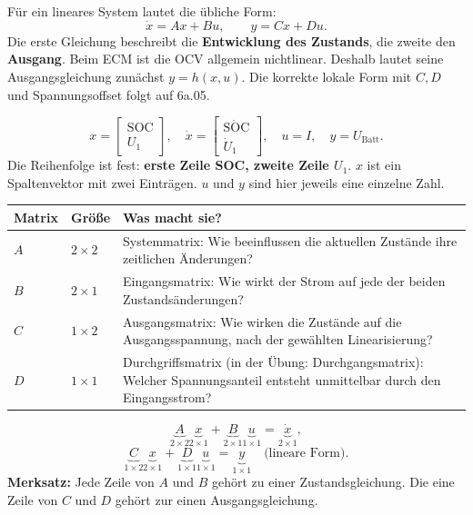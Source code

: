 Für ein lineares System lautet die übliche Form:
\[
\boxed{\dot x=Ax+Bu},\qquad \boxed{y=Cx+Du}.
\]
Die erste Gleichung beschreibt die \textbf{Entwicklung des Zustands}, die zweite den \textbf{Ausgang}. Beim ECM ist die OCV allgemein nichtlinear. Deshalb lautet seine Ausgangsgleichung zunächst $y=h(x,u)$. Die korrekte lokale Form mit $C,D$ und Spannungsoffset folgt auf 6a.05.

\[
x=\begin{bmatrix}\mathrm{SOC}\\U_1\end{bmatrix},\quad
\dot x=\begin{bmatrix}\dot{\mathrm{SOC}}\\\dot U_1\end{bmatrix},\quad
u=I,\quad y=U_{\mathrm{Batt}}.
\]
Die Reihenfolge ist fest: \textbf{erste Zeile SOC, zweite Zeile $U_1$}. $x$ ist ein Spaltenvektor mit zwei Einträgen. $u$ und $y$ sind hier jeweils eine einzelne Zahl.

\begin{tabular}{p{.10\linewidth}p{.18\linewidth}p{.60\linewidth}}
\toprule Matrix & Größe & Was macht sie?\\\midrule
$A$ & $2\times2$ & Systemmatrix: Wie beeinflussen die aktuellen Zustände ihre zeitlichen Änderungen?\\[7pt]
$B$ & $2\times1$ & Eingangsmatrix: Wie wirkt der Strom auf jede der beiden Zustandsänderungen?\\[7pt]
$C$ & $1\times2$ & Ausgangsmatrix: Wie wirken die Zustände auf die Ausgangsspannung, nach der gewählten Linearisierung?\\[7pt]
$D$ & $1\times1$ & Durchgriffsmatrix (in der Übung: Durchgangsmatrix): Welcher Spannungsanteil entsteht unmittelbar durch den Eingangsstrom?\\\bottomrule
\end{tabular}

\[
\underbrace{A}_{2\times2}\underbrace{x}_{2\times1}
+\underbrace{B}_{2\times1}\underbrace{u}_{1\times1}
=\underbrace{\dot x}_{2\times1},
\]
\[
\underbrace{C}_{1\times2}\underbrace{x}_{2\times1}
+\underbrace{D}_{1\times1}\underbrace{u}_{1\times1}
=\underbrace{y}_{1\times1}\quad\text{(lineare Form)}.
\]
\textbf{Merksatz:} Jede Zeile von $A$ und $B$ gehört zu einer Zustandsgleichung. Die eine Zeile von $C$ und $D$ gehört zur einen Ausgangsgleichung.

